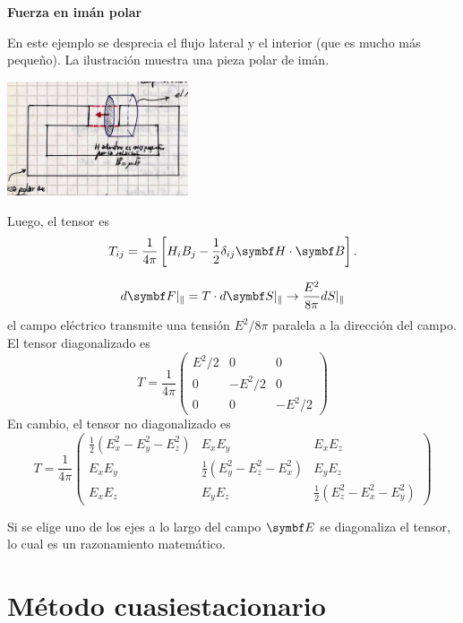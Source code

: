 \documentclass[10pt,oneside]{CBFT_book}
\begin{document}
\begin{ejemplo}{\bf Fuerza en imán polar}

En este ejemplo se desprecia el flujo lateral y el interior (que es mucho más pequeño).
La ilustración muestra una pieza polar de imán.

\includegraphics[width=0.4\textwidth]{images/fig_ft1_imanPolar.jpg}
 
Luego, el tensor es
\[
	T_{ij} = \frac{1}{4\pi} \left[ H_i B_j - \frac{1}{2} \delta_{ij} \vb{H}\cdot\vb{B} \right].
\]
 
\end{ejemplo}


\[
	d\vb{F}|_{\parallel} = T\cdot d\vb{S}|_{\parallel} \rightarrow \frac{E^2}{8\pi} dS|_{\parallel}
\]
el campo eléctrico transmite una tensión $E^2/8\pi$ paralela a la dirección del campo.
El tensor diagonalizado es 
\[
	T = \frac{1}{4\pi}\begin{pmatrix}
	        E^2/2	& 0 	& 0 \\
		0	& -E^2/2	& 0 \\
		0	& 0	& -E^2/2
	       \end{pmatrix}
\]
En cambio, el tensor no diagonalizado es
\[
	T = \frac{1}{4\pi}\begin{pmatrix}
	        \frac{1}{2}( E_x^2 - E_y^2 -E_z^2 ) & E_x E_y	& E_x E_z \\
		E_x E_y	& \frac{1}{2}( E_y^2 - E_z^2 -E_x^2 ) & E_y E_z \\
		E_x E_z & E_y E_z & \frac{1}{2}( E_z^2 - E_x^2 -E_y^2 )
	       \end{pmatrix}
\]

Si se elige uno de los ejes a lo largo del campo $\vb{E}$ se diagonaliza el tensor, lo cual es
un razonamiento matemático.

\section{Método cuasiestacionario}
\end{document}
